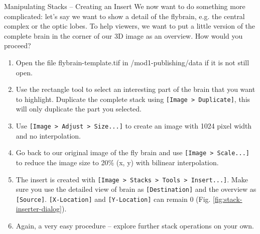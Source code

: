 \begin{taskbox}{Manipulating Stacks -- Creating an Insert}
We now want to do something more complicated: let's say we want to show a detail of the flybrain, e.g. the central complex or the optic lobes. To help viewers, we want to put a little version of the complete brain in the corner of our 3D image as an overview. How would you proceed?

\begin{enumerate}
	\item Open the file flybrain-template.tif in /mod1-publishing/data if it is not still open.
	\item Use the rectangle tool to select an interesting part of the brain that you want to highlight. Duplicate the complete stack using \texttt{[Image > Duplicate]}, this will only duplicate the part you selected. 
	\item Use \texttt{[Image > Adjust > Size...]} to create an image with 1024 pixel width and no interpolation.
	\item Go back to our original image of the fly brain and use \texttt{[Image > Scale...]} to reduce the image size to 20\% (x, y) with bilinear interpolation.
	\item The insert is created with \texttt{[Image > Stacks > Tools > Insert...]}. Make sure you use the detailed view of brain as \texttt{[Destination]} and the overview as \texttt{[Source]}. \texttt{[X-Location]} and \texttt{[Y-Location]} can remain 0 (Fig. \ref{fig:stack-inserter-dialog}).
	
	\begin{minipage}[t]{\linewidth}
		\begin{center}
		\medskip
		\label{fig:stack-inserter-dialog}
		\end{center}
	\end{minipage}
	
	\item Again, a very easy procedure -- explore further stack operations on your own.
\end{enumerate}

\end{taskbox}

